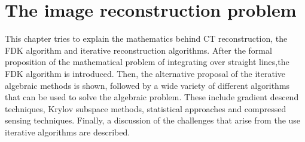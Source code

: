 \chapter{The image reconstruction problem}


This chapter tries to explain the mathematics behind CT reconstruction, the FDK algorithm and iterative reconstruction algorithms. After the formal proposition of the mathematical problem of integrating over straight lines,the FDK algorithm is introduced. Then, the alternative proposal of the iterative algebraic methods is shown, followed by a wide variety of different algorithms that can be used to solve the algebraic problem. These include gradient descend techniques, Krylov subspace methods, statistical approaches and compressed sensing techniques. Finally, a discussion of the challenges that arise from the use iterative algorithms are described.  

